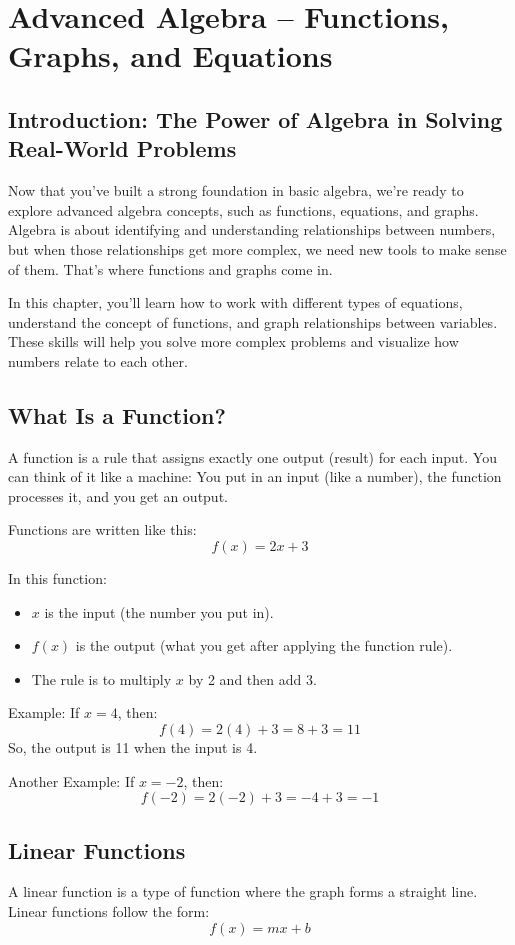 
\chapter{Advanced Algebra – Functions, Graphs, and Equations}

\section{Introduction: The Power of Algebra in Solving Real-World Problems}
Now that you’ve built a strong foundation in basic algebra, we’re ready to explore advanced algebra concepts, such as functions, equations, and graphs. Algebra is about identifying and understanding relationships between numbers, but when those relationships get more complex, we need new tools to make sense of them. That’s where functions and graphs come in.

In this chapter, you’ll learn how to work with different types of equations, understand the concept of functions, and graph relationships between variables. These skills will help you solve more complex problems and visualize how numbers relate to each other.

\section{What Is a Function?}
A function is a rule that assigns exactly one output (result) for each input. You can think of it like a machine: You put in an input (like a number), the function processes it, and you get an output.

Functions are written like this:
\[ f(x) = 2x + 3 \]

In this function:
\begin{itemize}
    \item \( x \) is the input (the number you put in).
    \item \( f(x) \) is the output (what you get after applying the function rule).
    \item The rule is to multiply \( x \) by 2 and then add 3.
\end{itemize}

Example: If \( x = 4 \), then:
\[ f(4) = 2(4) + 3 = 8 + 3 = 11 \]
So, the output is 11 when the input is 4.

Another Example: If \( x = -2 \), then:
\[ f(-2) = 2(-2) + 3 = -4 + 3 = -1 \]

\section{Linear Functions}
A linear function is a type of function where the graph forms a straight line. Linear functions follow the form:
\[ f(x) = mx + b \]


